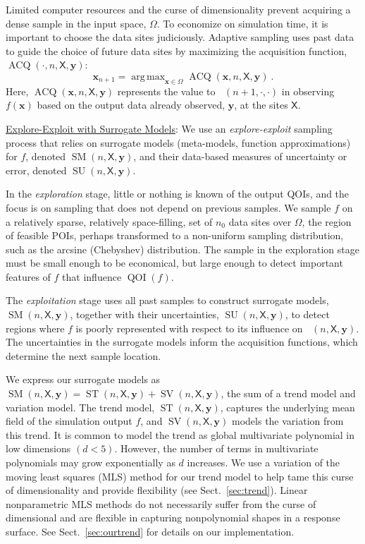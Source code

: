 \documentclass[11pt]{NSFamsart}
\newcommand{\Upara}[1]{\noindent\underline{\upshape #1}:}
\DeclareMathOperator*{\argmax}{arg\,max}
\DeclareMathOperator{\QOI}{QOI} %
\DeclareMathOperator{\APP}{\widehat{\QOI}}
\DeclareMathOperator{\SURR}{SM} %
\DeclareMathOperator{\STREND}{ST} %
\DeclareMathOperator{\SVAR}{SV} %
\newcommand{\MLS}{\textrm{MLS}\xspace} %
\DeclareMathOperator{\VAL}{ACQ}
\DeclareMathOperator{\SURRERR}{SU}
\newcommand{\mX}{\mathsf{X}}
\newcommand{\bx}{{\boldsymbol{x}}}
\newcommand{\by}{{\boldsymbol{y}}}
\begin{document}
Limited computer resources and the curse of dimensionality prevent acquiring a dense sample in the input space, $\Omega$. To economize on simulation time, it is important to choose the data sites judiciously. Adaptive sampling uses past data to guide the choice of future data sites by maximizing the acquisition function, $\VAL(\cdot,n,\mX, \by)$:   
\begin{equation} \label{eq:nextsample}
    \bx_{n+1} = \argmax_{\bx \in \Omega} \VAL(\bx,n,\mX, \by)~.
\end{equation}
Here, $\VAL(\bx,n,\mX, \by)$ represents the value to $\APP(n+1,\cdot,\cdot)$ in observing $f(\bx)$ based on the output data already observed, $\by$, at the sites $\mX$.  

\Upara{Explore-Exploit with Surrogate Models} We use an \emph{explore-exploit} sampling process that relies on surrogate models (meta-models, function approximations) for $f$, denoted $\SURR(n,\mX,\by)$, and their data-based measures of uncertainty or error, denoted $\SURRERR(n,\mX,\by)$.  

In the \emph{exploration} stage, little or nothing is known of the output QOIs, and the focus is on sampling that does not depend on previous samples.  We sample $f$ on a relatively sparse, relatively space-filling, set of $n_0$ data sites over $\Omega$, the region of feasible POIs, perhaps transformed to a non-uniform sampling distribution, such as the arcsine (Chebyshev) distribution. The sample in the exploration stage must be small enough to be economical, but large enough to detect important features of $f$ that influence $\QOI(f)$.

The \emph{exploitation} stage uses all past samples to construct surrogate models, $\SURR(n,\mX,\by)$, together with their uncertainties, $\SURRERR(n,\mX,\by)$, to detect regions where $f$ is poorly represented with respect to its influence on $\APP(n,\mX,\by)$.  The uncertainties in the surrogate models inform the acquisition functions, which determine the next sample location.

We express our surrogate models as $\SURR(n,\mX,\by) = \STREND(n,\mX,\by) + \SVAR(n,\mX,\by)$, the sum of a trend model and  variation model. 
The trend model, $\STREND(n,\mX,\by)$, captures the underlying mean field of the simulation output $f$,  and  $\SVAR(n,\mX,\by)$ models the variation from this trend. 
It is common to model the trend as global multivariate polynomial in low dimensions $(d<5)$. 
However, the number of terms in multivariate polynomials may grow exponentially as $d$ increases.  We use  
a variation of the moving least squares (\MLS) method \cite{liumovingpartI1997, limovingpartII1996, salehi2013generalized, mederos2003moving} for our trend model to help tame this curse of dimensionality and provide flexibility (see Sect.\ \ref{sec:trend}).  Linear nonparametric \MLS methods do not necessarily suffer from the curse of dimensional and are flexible in capturing nonpolynomial shapes in a response surface.  
See Sect.\ \ref{sec:ourtrend} for details on our implementation.  
\end{document}
